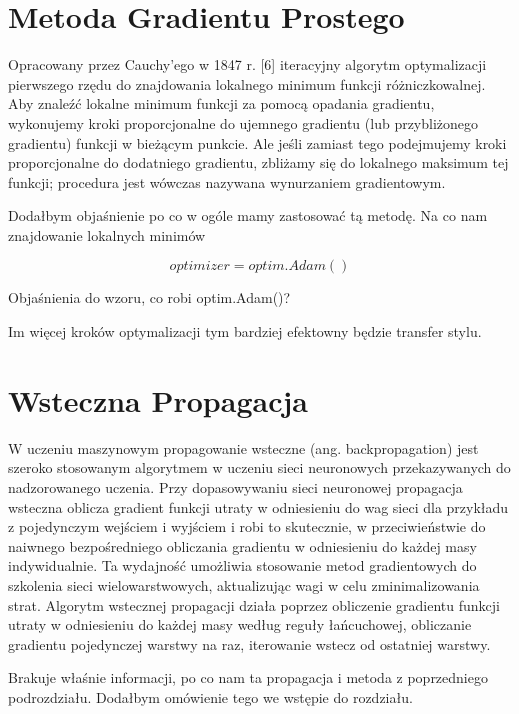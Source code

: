 \documentclass[brudnopis]{xmgr}
\begin{document}
 \section{Metoda Gradientu Prostego\label{s:dsssl}}

Opracowany przez Cauchy'ego w 1847 r. [6] iteracyjny algorytm optymalizacji pierwszego rzędu do znajdowania lokalnego minimum funkcji różniczkowalnej. Aby znaleźć lokalne minimum funkcji za pomocą opadania gradientu, wykonujemy kroki proporcjonalne do ujemnego gradientu (lub przybliżonego gradientu) funkcji w bieżącym punkcie. Ale jeśli zamiast tego podejmujemy kroki proporcjonalne do dodatniego gradientu, zbliżamy się do lokalnego maksimum tej funkcji; procedura jest wówczas nazywana wynurzaniem gradientowym. 

Dodałbym objaśnienie po co w ogóle mamy zastosować tą metodę. Na co nam znajdowanie lokalnych minimów


\begin{equation}
optimizer = optim.Adam()
\end{equation}


Objaśnienia do wzoru, co robi optim.Adam()? 

Im więcej kroków optymalizacji tym bardziej efektowny będzie transfer stylu.


\section{Wsteczna Propagacja\label{s:dsssl}}

W uczeniu maszynowym propagowanie wsteczne (ang. backpropagation) jest szeroko stosowanym algorytmem w uczeniu sieci neuronowych przekazywanych do nadzorowanego uczenia. Przy dopasowywaniu sieci neuronowej propagacja wsteczna oblicza gradient funkcji utraty w odniesieniu do wag sieci dla przykładu z pojedynczym wejściem i wyjściem i robi to skutecznie, w przeciwieństwie do naiwnego bezpośredniego obliczania gradientu w odniesieniu do każdej masy indywidualnie. Ta wydajność umożliwia stosowanie metod gradientowych do szkolenia sieci wielowarstwowych, aktualizując wagi w celu zminimalizowania strat. Algorytm wstecznej propagacji działa poprzez obliczenie gradientu funkcji utraty w odniesieniu do każdej masy według reguły łańcuchowej, obliczanie gradientu pojedynczej warstwy na raz, iterowanie wstecz od ostatniej warstwy.

Brakuje właśnie informacji, po co nam ta propagacja i metoda z poprzedniego podrozdziału. Dodałbym omówienie tego we wstępie do rozdziału.
\end{document}

